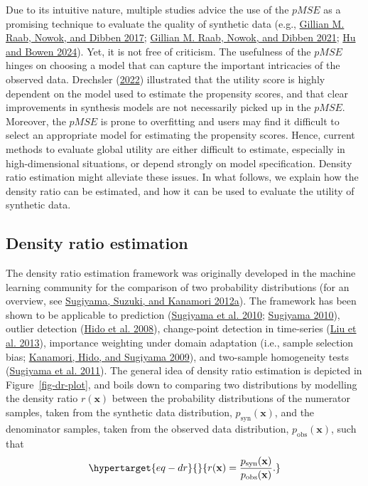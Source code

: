 \documentclass[
]{article}
\newcommand{\pobs}{p_{\text{obs}}}
\newcommand{\psyn}{p_{\text{syn}}}
\newcommand{\bx}{\mathbf{x}}
\begin{document}
Due to its intuitive nature, multiple studies advice the use of the
\(pMSE\) as a promising technique to evaluate the quality of synthetic
data (e.g., \protect\hyperlink{ref-raab2017guidelines}{Gillian M. Raab,
Nowok, and Dibben 2017};
\protect\hyperlink{ref-raab2021assessing}{Gillian M. Raab, Nowok, and
Dibben 2021}; \protect\hyperlink{ref-hu_advancing_2024}{Hu and Bowen
2024}). Yet, it is not free of criticism. The usefulness of the \(pMSE\)
hinges on choosing a model that can capture the important intricacies of
the observed data. Drechsler
(\protect\hyperlink{ref-drechsler_utility_2022}{2022}) illustrated that
the utility score is highly dependent on the model used to estimate the
propensity scores, and that clear improvements in synthesis models are
not necessarily picked up in the \(pMSE\). Moreover, the \(pMSE\) is
prone to overfitting and users may find it difficult to select an
appropriate model for estimating the propensity scores. Hence, current
methods to evaluate global utility are either difficult to estimate,
especially in high-dimensional situations, or depend strongly on model
specification. Density ratio estimation might alleviate these issues. In
what follows, we explain how the density ratio can be estimated, and how
it can be used to evaluate the utility of synthetic data.

\hypertarget{density-ratio-estimation}{%
\subsection{Density ratio estimation}\label{density-ratio-estimation}}

The density ratio estimation framework was originally developed in the
machine learning community for the comparison of two probability
distributions (for an overview, see
\protect\hyperlink{ref-sugiyama_suzuki_kanamori_2012}{Sugiyama, Suzuki,
and Kanamori 2012a}). The framework has been shown to be applicable to
prediction (\protect\hyperlink{ref-sugiyama_conditional_2010}{Sugiyama
et al. 2010};
\protect\hyperlink{ref-sugiyama_classification_2010}{Sugiyama 2010}),
outlier detection (\protect\hyperlink{ref-shohei_dre_outlier_2008}{Hido
et al. 2008}), change-point detection in time-series
(\protect\hyperlink{ref-liu_change_2013}{Liu et al. 2013}), importance
weighting under domain adaptation (i.e., sample selection bias;
\protect\hyperlink{ref-kanamori_ulsif_2009}{Kanamori, Hido, and Sugiyama
2009}), and two-sample homogeneity tests
(\protect\hyperlink{ref-sugiyama_lstst_2011}{Sugiyama et al. 2011}). The
general idea of density ratio estimation is depicted in
Figure~\ref{fig-dr-plot}, and boils down to comparing two distributions
by modelling the density ratio \(r(\bx)\) between the probability
distributions of the numerator samples, taken from the synthetic data
distribution, \(\psyn(\bx)\), and the denominator samples, taken from
the observed data distribution, \(\pobs(\bx)\), such that
\begin{equation}\protect\hypertarget{eq-dr}{}{
r(\bx) = \frac{\psyn(\bx)}{\pobs(\bx)}.
}\label{eq-dr}\end{equation}
\end{document}
